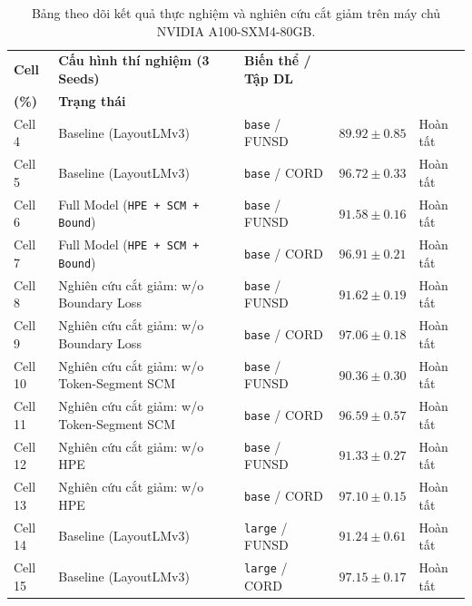 \begin{table}[htbp]
\centering
\small
\caption{Bảng theo dõi kết quả thực nghiệm và nghiên cứu cắt giảm trên máy chủ NVIDIA A100-SXM4-80GB.}
\label{tab:ablation_live_tracker}
\renewcommand{\arraystretch}{1.15}
\setlength{\tabcolsep}{3.5pt}
\begin{tabularx}{\textwidth}{|>{\Centering\arraybackslash}p{1.8cm}|>{\RaggedRight\arraybackslash}X|>{\Centering\arraybackslash}p{2.5cm}|>{\Centering\arraybackslash}p{2.6cm}|>{\Centering\arraybackslash}p{2.0cm}|}
\hline
\textbf{Cell} & \textbf{Cấu hình thí nghiệm (3 Seeds)} & \textbf{Biến thể / Tập DL} & \makecell{\textbf{Điểm F1}\\\textbf{(\%)}} & \textbf{Trạng thái} \\ \hline
Cell 4 & Baseline (\mbox{LayoutLMv3}) & \texttt{base} / FUNSD & $\mathbf{89.92 \pm 0.85}$ & Hoàn tất \\ \hline
Cell 5 & Baseline (\mbox{LayoutLMv3}) & \texttt{base} / CORD & $\mathbf{96.72 \pm 0.33}$ & Hoàn tất \\ \hline
\rowcolor{blue!8}
Cell 6 & Full Model (\texttt{HPE + SCM + Bound}) & \texttt{base} / FUNSD & $\mathbf{91.58 \pm 0.16}$ & Hoàn tất \\ \hline
\rowcolor{blue!8}
Cell 7 & Full Model (\texttt{HPE + SCM + Bound}) & \texttt{base} / CORD & $\mathbf{96.91 \pm 0.21}$ & Hoàn tất \\ \hline
Cell 8 & Nghiên cứu cắt giảm: w/o Boundary Loss & \texttt{base} / FUNSD & $\mathbf{91.62 \pm 0.19}$ & Hoàn tất \\ \hline
Cell 9 & Nghiên cứu cắt giảm: w/o Boundary Loss & \texttt{base} / CORD & $\mathbf{97.06 \pm 0.18}$ & Hoàn tất \\ \hline
Cell 10 & Nghiên cứu cắt giảm: w/o Token-Segment SCM & \texttt{base} / FUNSD & $\mathbf{90.36 \pm 0.30}$ & Hoàn tất \\ \hline
Cell 11 & Nghiên cứu cắt giảm: w/o Token-Segment SCM & \texttt{base} / CORD & $\mathbf{96.59 \pm 0.57}$ & Hoàn tất \\ \hline
Cell 12 & Nghiên cứu cắt giảm: w/o HPE & \texttt{base} / FUNSD & $\mathbf{91.33 \pm 0.27}$ & Hoàn tất \\ \hline
Cell 13 & Nghiên cứu cắt giảm: w/o HPE & \texttt{base} / CORD & $\mathbf{97.10 \pm 0.15}$ & Hoàn tất \\ \hline
Cell 14 & Baseline (\mbox{LayoutLMv3}) & \texttt{large} / FUNSD & $\mathbf{91.24 \pm 0.61}$ & Hoàn tất \\ \hline
Cell 15 & Baseline (\mbox{LayoutLMv3}) & \texttt{large} / CORD & $\mathbf{97.15 \pm 0.17}$ & Hoàn tất \\ \hline

\end{tabularx}
\end{table}
